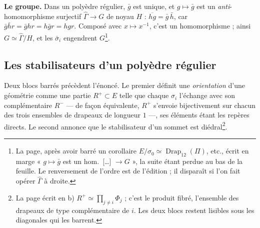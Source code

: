 \documentclass[11pt,a4paper]{article}
\begin{document}
\textbf{Le groupe.} Dans un polyèdre régulier, $\bar g$ est unique, et
$g \mapsto \bar g$ est un \emph{anti}-homomorphisme surjectif
$\widehat{\Gamma} \to G$ de noyau $H$ : $\overline{hg} = \bar g\,\bar h$, car
$\bar g \bar h r = \bar g h r = h \bar g r = h g r$. Composé avec $x \mapsto
x^{-1}$, c'est un homomorphisme ; ainsi $G \simeq \widehat{\Gamma}/H$, et les
$\bar\sigma_i$ engendrent $G$\footnote{La page, après avoir barré un corollaire
$E/\sigma_0 \simeq \operatorname{Drap}_{12}(\Pi)$, etc., écrit en marge
« $g \mapsto \bar g$ est un hom.\ […] $\to G$ », la suite étant perdue au bas
de la feuille. Le renversement de l'ordre est de l'édition ; il disparaît si
l'on fait opérer $\widehat{\Gamma}$ à droite.}.

\subsection*{Les stabilisateurs d'un polyèdre régulier}

Deux blocs barrés précèdent l'énoncé. Le premier définit une
\emph{orientation} d'une géométrie comme une partie $R^{+} \subset E$ telle que
chaque $\sigma_i$ l'échange avec son complémentaire $R^{-}$ --- de façon
équivalente, $R^{+}$ s'envoie bijectivement sur chacun des trois ensembles de
drapeaux de longueur $1$ ---, ses éléments étant les repères directs. Le
second annonce que le stabilisateur d'un sommet est diédral\footnote{La page
écrit en b) $R^{+} \simeq \prod_{j \neq i} \Phi_j$ ; c'est le produit fibré,
l'ensemble des drapeaux de type complémentaire de $i$. Les deux blocs restent
lisibles sous les diagonales qui les barrent.}.
\end{document}
